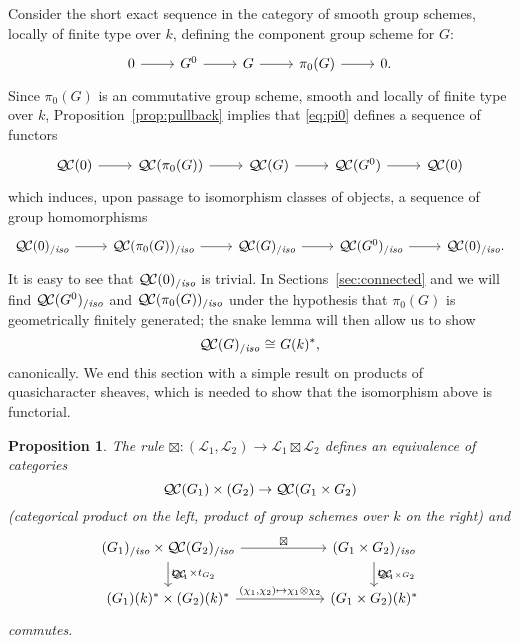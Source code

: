 \documentclass[11pt]{amsart}
\theoremstyle{plain}
\newtheorem{proposition}[theorem]{Proposition}
\theoremstyle{definition}
\theoremstyle{remark}
\newcommand{\EE}{\mathbb{\bar Q}_\ell}
\newcommand{\Fq}{k}
\DeclareMathOperator{\Hom}{Hom}
\newcommand{\iso}{{\ \cong\ }}
\newcommand{\qcs}[1]{{\mathcal{#1}}}
\newcommand{\QC}{{\mathcal{Q\hskip-0.8pt C}}}
\newcommand{\QCiso}[1]{\QC(#1)_{/\textit{iso}}}
\newcommand{\trFrob}[1]{t_{#1}}
\begin{document}
Consider the short exact sequence in the category of smooth group
schemes, locally of finite type over $\Fq$, defining the component
group scheme for $G$:
\begin{equation}\label{eq:pi0}
\begin{tikzcd}
0 \rar & G^0 \rar & G \rar & \pi_0(G) \rar & 0.
\end{tikzcd}
\end{equation}
Since $\pi_0(G)$ is an commutative group scheme, smooth and locally of finite type over $\Fq$, 
Proposition~\ref{prop:pullback} implies that \eqref{eq:pi0} defines a sequence of functors
\[
\begin{tikzcd}
\QC(0) \rar & \QC(\pi_0(G)) \rar & \QC(G) \rar & \QC(G^0) \rar & \QC(0)
\end{tikzcd}
\]
which induces, upon passage to isomorphism classes of objects, a sequence of group homomorphisms 
\[
\begin{tikzcd}
\QCiso{0} \rar & \QCiso{\pi_0(G)} \rar & \QCiso{G} \rar & \QCiso{G^0} \rar & \QCiso{0}.
\end{tikzcd}
\]
It is easy to see that $\QCiso{0}$ is trivial. In Sections~\ref{sec:connected} and  we will find $\QCiso{G^0}$
and $\QCiso{\pi_0(G)}$ under the hypothesis that $\pi_0(G)$ is geometrically finitely generated; 
the snake lemma will then allow us to show
\[
\QCiso{G} \iso G(\Fq)^*,%
\]
canonically.
We end this section with a simple result on products of quasicharacter sheaves,
which is needed to show that the isomorphism above is functorial.

\begin{proposition}\label{prop:product}
The rule $\boxtimes : (\qcs{L}_1,\qcs{L}_2)\to \qcs{L}_1\boxtimes\qcs{L}_2$ defines an equivalence of categories 
\[
\QC(G_1)\times (G_2) \to \QC(G_1\times G_2)
\]
(categorical product on the left, product of group schemes over $\Fq$ on the right) and 
\[
\begin{tikzcd}[column sep=60]
\arrow{d}{\trFrob{G_1} \times \trFrob{G_2}} \QCiso{G_1}\times \QCiso{G_2} \arrow{r}{\boxtimes}
& \arrow{d}{\trFrob{G_1\times G_2}} \QCiso{G_1\times G_2}\\
(G_1)(\Fq)^*\times (G_2)(\Fq)^* \arrow{r}{(\chi_1,\chi_2)\mapsto \chi_1\otimes \chi_2}  & (G_1\times G_2)(\Fq)^*
\end{tikzcd}
\]
commutes.
\end{proposition}
\end{document}
